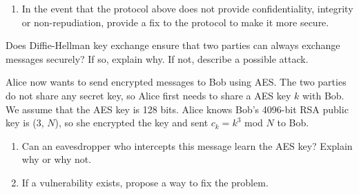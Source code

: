 \begin{enumerate}
    \item In the event that the protocol above does not provide
      confidentiality, integrity or 
      non-repudiation, provide a fix to the protocol to make
      it more secure. \\ 


\end{enumerate}
\eprob

\newpage
{} Does Diffie-Hellman key exchange ensure that two
parties can always exchange messages securely? If so, explain why. If
not, describe a possible attack. \eprob
\vspace*{0.5in}


 Alice now wants to send encrypted messages to Bob using AES.
The two parties do not share any secret key, so Alice first needs to 
share a AES key $k$ with Bob. We assume that the AES key is 128 bits. Alice
knows Bob's 4096-bit RSA public key is (3, $N$), so she encrypted the key and
sent $c_k = k^3$ mod $N$ to Bob. 

\begin {enumerate} 
\item Can an eavesdropper who intercepts this message learn
the AES key? Explain why or why not.  


\item If a vulnerability exists, propose a way to fix the problem.


\end{enumerate}
\eprob
\vspace*{1.5in}


